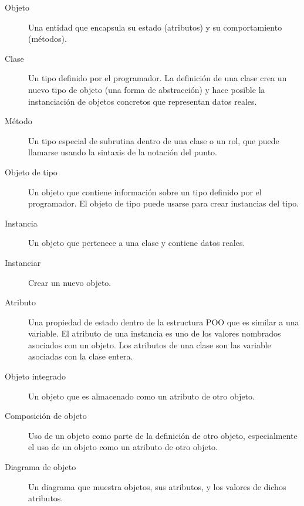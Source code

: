 \begin{description}

\item[Objeto] Una entidad que encapsula su estado (atributos)
y su comportamiento (métodos).

\item[Clase] Un tipo definido por el programador. La definición de
una clase crea un nuevo tipo de objeto (una forma de abstracción) y
hace posible la instanciación de objetos concretos que representan
datos reales.

\item[Método] Un tipo especial de subrutina dentro de una clase o un rol,
que puede llamarse usando la sintaxis de la notación del punto.

\item[Objeto de tipo] Un objeto que contiene información sobre un 
tipo definido por el programador. El objeto de tipo puede usarse 
para crear instancias del tipo.

\item[Instancia] Un objeto que pertenece a una clase y contiene
datos reales.

\item[Instanciar] Crear un nuevo objeto.

\item[Atributo] Una propiedad de estado dentro de la estructura
POO que es similar a una variable. El atributo de una instancia 
es uno de los valores nombrados asociados con un objeto. Los
atributos de una clase son las variable asociadas con la clase
entera. 

\item[Objeto integrado] Un objeto que es almacenado como un
atributo de otro objeto.

\item[Composición de objeto] Uso de un objeto como parte de la 
definición de otro objeto, especialmente el uso de un objeto como
un atributo de otro objeto.

\item[Diagrama de objeto] Un diagrama que muestra objetos, sus atributos, 
y los valores de dichos atributos.


\end{description}
